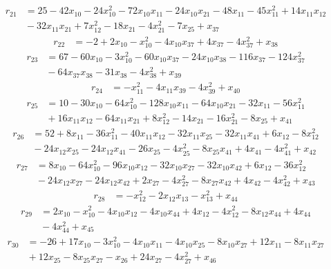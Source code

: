 \[\begin{aligned}
r_{21}&=25-42x_{10}-24x_{10}^{2}-72x_{10}x_{11}-24x_{10}x_{21}-48x_{11}-45x_{11}^{2}+14x_{11}x_{12}\\
&{}-32x_{11}x_{21}+7x_{12}^{2}-18x_{21}-4x_{21}^{2}-7x_{25}+x_{37}
\end{aligned}\]
\[\begin{aligned}
r_{22}&=-2+2x_{10}-x_{10}^{2}-4x_{10}x_{37}+4x_{37}-4x_{37}^{2}+x_{38}
\end{aligned}\]
\[\begin{aligned}
r_{23}&=67-60x_{10}-3x_{10}^{2}-60x_{10}x_{37}-24x_{10}x_{38}-116x_{37}-124x_{37}^{2}\\
&{}-64x_{37}x_{38}-31x_{38}-4x_{38}^{2}+x_{39}
\end{aligned}\]
\[\begin{aligned}
r_{24}&=-x_{11}^{2}-4x_{11}x_{39}-4x_{39}^{2}+x_{40}
\end{aligned}\]
\[\begin{aligned}
r_{25}&=10-30x_{10}-64x_{10}^{2}-128x_{10}x_{11}-64x_{10}x_{21}-32x_{11}-56x_{11}^{2}\\
&{}+16x_{11}x_{12}-64x_{11}x_{21}+8x_{12}^{2}-14x_{21}-16x_{21}^{2}-8x_{25}+x_{41}
\end{aligned}\]
\[\begin{aligned}
r_{26}&=52+8x_{11}-36x_{11}^{2}-40x_{11}x_{12}-32x_{11}x_{25}-32x_{11}x_{41}+6x_{12}-8x_{12}^{2}\\
&{}-24x_{12}x_{25}-24x_{12}x_{41}-26x_{25}-4x_{25}^{2}-8x_{25}x_{41}+4x_{41}-4x_{41}^{2}+x_{42}
\end{aligned}\]
\[\begin{aligned}
r_{27}&=8x_{10}-64x_{10}^{2}-96x_{10}x_{12}-32x_{10}x_{27}-32x_{10}x_{42}+6x_{12}-36x_{12}^{2}\\
&{}-24x_{12}x_{27}-24x_{12}x_{42}+2x_{27}-4x_{27}^{2}-8x_{27}x_{42}+4x_{42}-4x_{42}^{2}+x_{43}
\end{aligned}\]
\[\begin{aligned}
r_{28}&=-x_{12}^{2}-2x_{12}x_{13}-x_{13}^{2}+x_{44}
\end{aligned}\]
\[\begin{aligned}
r_{29}&=2x_{10}-x_{10}^{2}-4x_{10}x_{12}-4x_{10}x_{44}+4x_{12}-4x_{12}^{2}-8x_{12}x_{44}+4x_{44}\\
&{}-4x_{44}^{2}+x_{45}
\end{aligned}\]
\[\begin{aligned}
r_{30}&=-26+17x_{10}-3x_{10}^{2}-4x_{10}x_{11}-4x_{10}x_{25}-8x_{10}x_{27}+12x_{11}-8x_{11}x_{27}\\
&{}+12x_{25}-8x_{25}x_{27}-x_{26}+24x_{27}-4x_{27}^{2}+x_{46}
\end{aligned}\]
